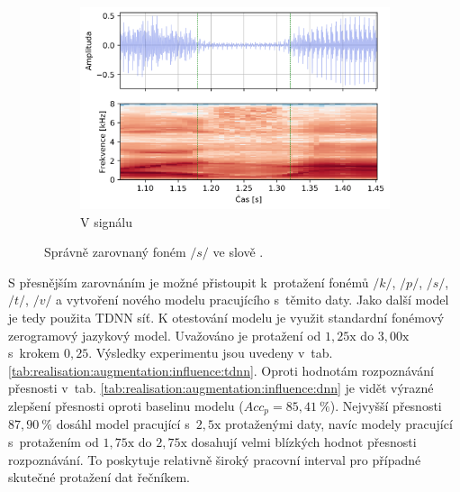 \begin{figure}[htpb]
\begin{subfigure}[b]{0.65\textwidth}
    \includegraphics[width=\textwidth]{./ch6-realisation/img/energy_spec_word-segment-2.png}
    \caption{V signálu}
    \label{fig:realisation:augmentation:alignemnt:correct:audio}
  \end{subfigure}
  \caption{Správně zarovnaný foném $/s/$ ve slově .}
  \label{fig:realisation:augmentation:alignemnt:correct}
\end{figure}

S přesnějším zarovnáním je možné přistoupit  k~protažení fonémů $/k/$, $/p/$, $/s/$, $/t/$, $/v/$ a vytvoření nového modelu pracujícího s~těmito daty.
Jako další model je tedy použita TDNN síť.
K otestování modelu je využit standardní fonémový zerogramový jazykový model.
Uvažováno je protažení od $1,25\mathrm{x}$ do $3,00\mathrm{x}$ s~krokem $0,25$. Výsledky experimentu jsou uvedeny v~tab. \ref{tab:realisation:augmentation:influence:tdnn}.
Oproti hodnotám rozpoznávání přesnosti v~tab. \ref{tab:realisation:augmentation:influence:dnn} je vidět výrazné zlepšení přesnosti oproti baselinu modelu ($Acc_{p} = 85,41~\%$).
Nejvyšší přesnosti $87,90~\%$ dosáhl model pracující s~$2,5\mathrm{x}$ protaženými daty, navíc modely pracující s~protažením od $1,75\mathrm{x}$ do $2,75\mathrm{x}$ dosahují velmi blízkých hodnot přesnosti rozpoznávání.
To poskytuje relativně široký pracovní interval pro případné skutečné protažení dat řečníkem.

